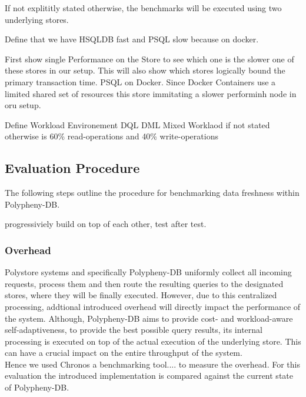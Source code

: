 If not explititly stated otherwise, the benchmarks will be executed using two underlying stores.

Define that we have HSQLDB fast and PSQL slow because on docker.

First show single Performance on the Store to see which one is the slower one of these stores in our setup.
This will also show which stores logically bound the primary transaction time. PSQL on Docker. Since Docker Containers use a limited shared set of resources 
this store immitating a slower performinh node in oru setup.


Define Workload Environement
DQL DML
Mixed Worklaod if not stated otherwise is  60\% read-operations and 40\% write-operations

\subsection{Evaluation Procedure}
The following steps outline the procedure for benchmarking data freshness within Polypheny-DB.


progressiviely build on top of each other, test after test.



\subsubsection{Overhead} 
Polystore systems and specifically Polypheny-DB uniformly collect all incoming requests, process them and then
route the resulting queries to the designated stores, where they will be finally executed. 
However, due to this centralized processing, addtional introduced overhead will directly impact the performance of the system.
Although, Polypheny-DB aims to provide cost- and workload-aware self-adaptiveness, to provide the best possible query results,
its internal processing is executed on top of the actual execution of the underlying store.
This can have a crucial impact on the entire throughput of the system.\\
Hence we used Chronos a benchmarking tool....
to measure the overhead. For this evaluation the introduced implementation is compared against the current state of Polypheny-DB.\\

